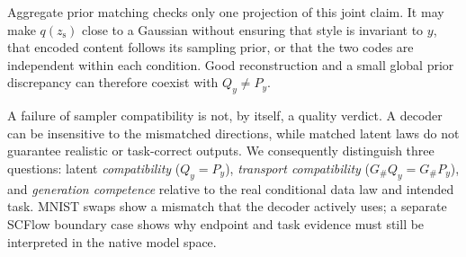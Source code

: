 \documentclass{article}
\newcommand{\zs}{z_{\mathrm{s}}}
\begin{document}
Aggregate prior matching checks only one projection of this joint claim.  It
may make $q(\zs)$ close to a Gaussian without ensuring that style is invariant
to $y$, that encoded content follows its sampling prior, or that the two codes
are independent within each condition.  Good reconstruction and a small global
prior discrepancy can therefore coexist with $Q_y\ne P_y$.

A failure of sampler compatibility is not, by itself, a quality verdict.  A decoder can be insensitive to the
mismatched directions, while matched latent laws do not guarantee realistic or
task-correct outputs.  We consequently distinguish three questions: latent
\emph{compatibility} ($Q_y=P_y$), \emph{transport compatibility}
($G_\#Q_y=G_\#P_y$), and \emph{generation competence} relative to the real
conditional data law and intended task.  MNIST swaps show a mismatch that the
decoder actively uses; a separate SCFlow boundary case shows why endpoint and
task evidence must still be interpreted in the native model space.
\end{document}
